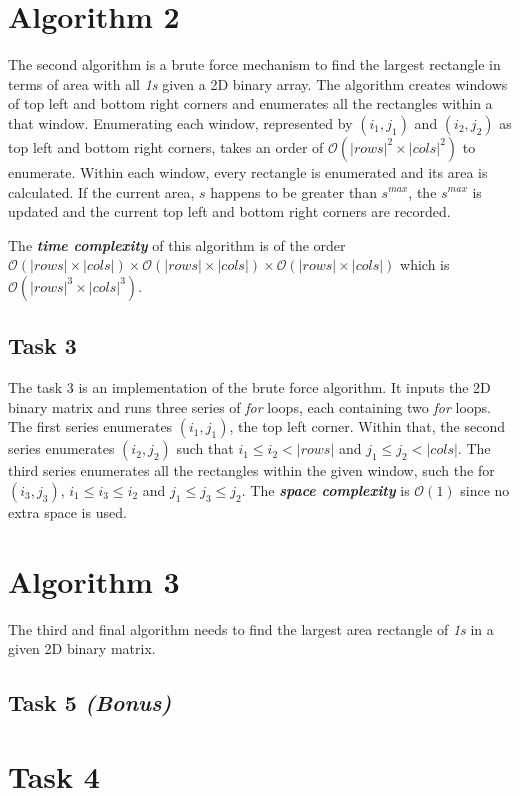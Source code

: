 \documentclass[10pt,a4paper]{article}
\begin{document}
\section*{Algorithm 2}
The second algorithm is a brute force mechanism to find the largest rectangle in terms of area with all \textit{1s} given a 2D binary array.
The algorithm creates windows of top left and bottom right corners and enumerates all the rectangles within a that window.
Enumerating each window, represented by $ (i_{1}, j_{1}) $ and $ (i_{2}, j_{2}) $ as top left and bottom right corners, takes an order of $ \mathcal{O}(|rows|^{2} \times |cols|^{2}) $ to enumerate.
Within each window, every rectangle is enumerated and its area is calculated.
If the current area, $ s $ happens to be greater than $ s^{max} $, the $ s^{max} $ is updated and the current top left and bottom right corners are recorded.

The \textbf{\textit{time complexity}} of this algorithm is of the order $ \mathcal{O}(|rows| \times |cols|) \times \mathcal{O}(|rows| \times |cols|) \times \mathcal{O}(|rows| \times |cols|) $ which is $ \mathcal{O}(|rows|^{3} \times |cols|^{3}) $.

\subsection*{Task 3}
The task 3 is an implementation of the brute force algorithm.
It inputs the 2D binary matrix and runs three series of \textit{for} loops, each containing two \textit{for} loops.
The first series enumerates $ (i_{1}, j_{1}) $, the top left corner.
Within that, the second series enumerates $ (i_{2}, j_{2}) $ such that $ i_{1} \leq i_{2} < |rows| $ and $ j_{1} \leq j_{2} < |cols| $.
The third series enumerates all the rectangles within the given window, such the for $ (i_{3}, j_{3}) $, $ i_{1} \leq i_{3} \leq i_{2} $ and $ j_{1} \leq j_{3} \leq j_{2} $.
The \textbf{\textit{space complexity}} is $ \mathcal{O}(1) $ since no extra space is used.

\section*{Algorithm 3}
The third and final algorithm needs to find the largest area rectangle of \textit{1s} in a given 2D binary matrix.

\subsection*{Task 5 \textit{(Bonus)}}

\section*{Task 4}
\end{document}
